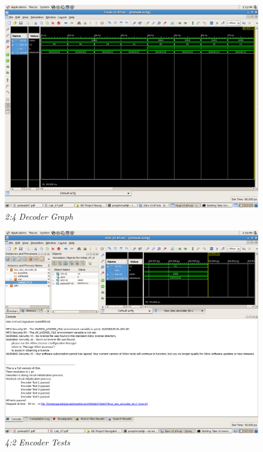 \documentclass[a4paper,12pt]{article}
\begin{document}
  \newpage

  \begin{figure}[h]
    \begin{center}
      \includegraphics[scale=0.18]{2_1_2.png}
      \caption{\textit{2:4 Decoder Graph}}
    \end{center}
  \end{figure}

  \begin{figure}[h]
    \begin{center}
      \includegraphics[scale=0.18]{2_2_1.png}
      \caption{\textit{4:2 Encoder Tests}}
    \end{center}
  \end{figure}
\end{document}
